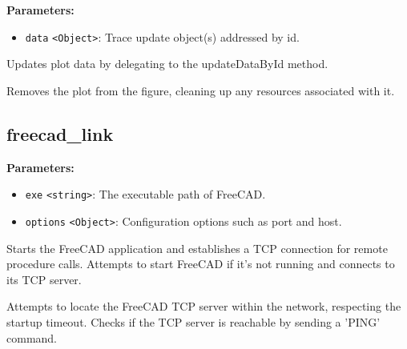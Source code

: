 \documentclass[12pt,a4paper]{article}
\begin{document}
\noindent \textbf{Parameters:}
\begin{itemize}
  \item \texttt{data} \texttt{<Object>}: Trace update object(s) addressed by \textasciigrave{}id\textasciigrave{}.
\end{itemize}

\noindent Updates plot data by delegating to the \textasciigrave{}updateDataById\textasciigrave{} method.

\vspace{5mm}
\noindent {}


\noindent Removes the plot from the figure, cleaning up any resources associated with it.


\subsection{freecad\_link}
\vspace{5mm}
\noindent {}


\noindent \textbf{Parameters:}
\begin{itemize}
  \item \texttt{exe} \texttt{<string>}: The executable path of FreeCAD.
  \item \texttt{options} \texttt{<Object>}: Configuration options such as port and host.
\end{itemize}

\noindent Starts the FreeCAD application and establishes a TCP connection for remote procedure calls.
Attempts to start FreeCAD if it's not running and connects to its TCP server.

\vspace{5mm}
\noindent {}


\noindent Attempts to locate the FreeCAD TCP server within the network, respecting the startup timeout.
Checks if the TCP server is reachable by sending a 'PING' command.

\vspace{5mm}
\noindent {}
\end{document}
